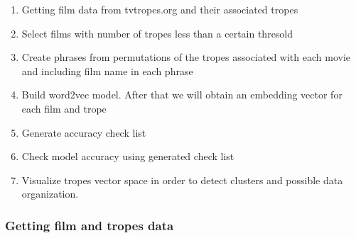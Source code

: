 \documentclass[letterpaper]{article}
\begin{document}
	\begin{enumerate}
		\item Getting film data from tvtropes.org and their associated tropes %
		\item Select films with number of tropes less than a certain thresold
		\item Create phrases from permutations of the tropes associated with each movie and including film name in each phrase
		\item Build word2vec model. After that we will obtain an embedding vector for each film and trope
		\item Generate accuracy check list %
		\item Check model accuracy using generated check list
		\item Visualize tropes vector space in order to detect clusters and possible data organization.
    \end{enumerate}


    \subsubsection{Getting film and tropes data}
		
\end{document}
